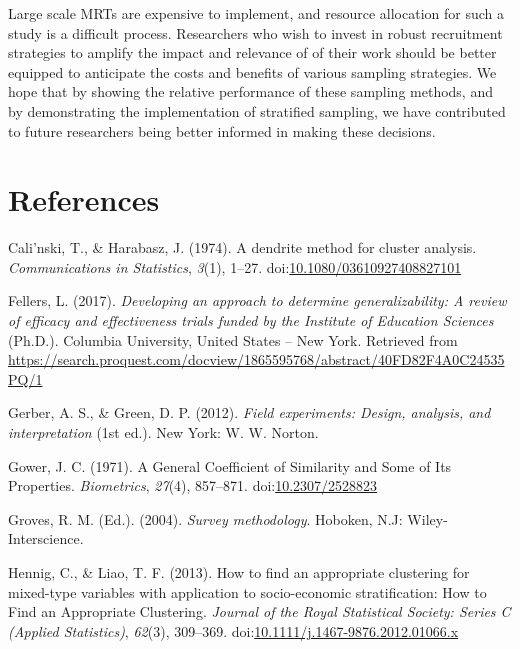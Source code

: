 \documentclass[man,floatsintext]{apa6}
\begin{document}
Large scale MRTs are expensive to implement, and resource allocation for such a study is a difficult process. Researchers who wish to invest in robust recruitment strategies to amplify the impact and relevance of of their work should be better equipped to anticipate the costs and benefits of various sampling strategies. We hope that by showing the relative performance of these sampling methods, and by demonstrating the implementation of stratified sampling, we have contributed to future researchers being better informed in making these decisions.

\hypertarget{references}{%
\section{References}\label{references}}

\begingroup
\setlength{\parindent}{-0.5in}
\setlength{\leftskip}{0.5in}

\hypertarget{refs}{}
\leavevmode\hypertarget{ref-calinskiDendriteMethodCluster1974}{}%
Cali\a'nski, T., \& Harabasz, J. (1974). A dendrite method for cluster analysis. \emph{Communications in Statistics}, \emph{3}(1), 1--27. doi:\href{https://doi.org/10.1080/03610927408827101}{10.1080/03610927408827101}

\leavevmode\hypertarget{ref-fellersDevelopingApproachDetermine2017}{}%
Fellers, L. (2017). \emph{Developing an approach to determine generalizability: A review of efficacy and effectiveness trials funded by the Institute of Education Sciences} (Ph.D.). Columbia University, United States -- New York. Retrieved from \url{https://search.proquest.com/docview/1865595768/abstract/40FD82F4A0C24535PQ/1}

\leavevmode\hypertarget{ref-gerberFieldExperimentsDesign2012}{}%
Gerber, A. S., \& Green, D. P. (2012). \emph{Field experiments: Design, analysis, and interpretation} (1st ed.). New York: W. W. Norton.

\leavevmode\hypertarget{ref-gowerGeneralCoefficientSimilarity1971}{}%
Gower, J. C. (1971). A General Coefficient of Similarity and Some of Its Properties. \emph{Biometrics}, \emph{27}(4), 857--871. doi:\href{https://doi.org/10.2307/2528823}{10.2307/2528823}

\leavevmode\hypertarget{ref-grovesSurveyMethodology2004}{}%
Groves, R. M. (Ed.). (2004). \emph{Survey methodology}. Hoboken, N.J: Wiley-Interscience.

\leavevmode\hypertarget{ref-hennigHowFindAppropriate2013}{}%
Hennig, C., \& Liao, T. F. (2013). How to find an appropriate clustering for mixed-type variables with application to socio-economic stratification: How to Find an Appropriate Clustering. \emph{Journal of the Royal Statistical Society: Series C (Applied Statistics)}, \emph{62}(3), 309--369. doi:\href{https://doi.org/10.1111/j.1467-9876.2012.01066.x}{10.1111/j.1467-9876.2012.01066.x}
\end{document}
